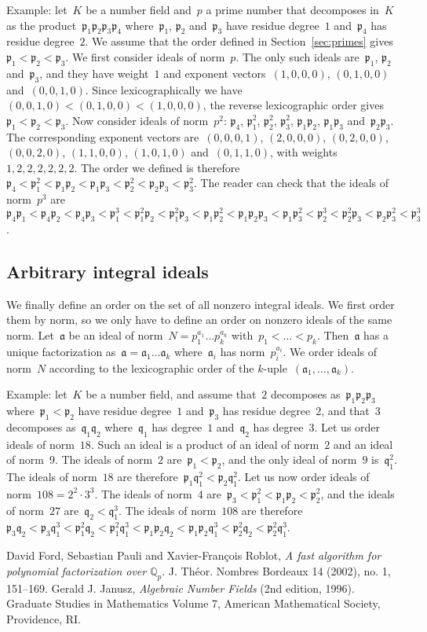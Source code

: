 \documentclass{article}
\def\a{{\mathfrak a}}
\def\p{{\mathfrak p}}
\def\q{{\mathfrak q}}
\begin{document}
Example: let~$K$ be a number field and~$p$ a prime number that decomposes in~$K$
as the product~$\p_1\p_2\p_3\p_4$ where~$\p_1$, $\p_2$ and~$\p_3$ have residue
degree~$1$ and~$\p_4$ has residue degree~$2$. We assume that the order defined
in Section~\ref{sec:primes} gives~$\p_1 < \p_2 < \p_3$. We first consider ideals
of norm~$p$. The only such ideals are~$\p_1$, $\p_2$ and~$\p_3$, and they have weight~$1$
and exponent vectors~$(1,0,0,0)$, $(0,1,0,0)$ and~$(0,0,1,0)$. Since
lexicographically we have~$(0,0,1,0)<(0,1,0,0)<(1,0,0,0)$, the reverse
lexicographic order gives~$\p_1<\p_2<\p_3$. Now
consider ideals of norm~$p^2$: $\p_4$, $\p_1^2$, $\p_2^2$, $\p_3^2$, $\p_1\p_2$,
$\p_1\p_3$ and~$\p_2\p_3$. The corresponding exponent vectors are~$(0,0,0,1)$,
$(2,0,0,0)$, $(0,2,0,0)$, $(0,0,2,0)$, $(1,1,0,0)$, $(1,0,1,0)$ and~$(0,1,1,0)$,
with weights~$1,2,2,2,2,2,2$. The order we defined is therefore~$\p_4 < \p_1^2 <
\p_1\p_2 < \p_1\p_3 < \p_2^2 < \p_2\p_3 < \p_3^2$. The reader can check that the
ideals of norm~$p^3$ are~$\p_4\p_1 < \p_4\p_2 < \p_4\p_3 < \p_1^3 < \p_1^2\p_2 <
\p_1^2\p_3 < \p_1\p_2^2 < \p_1\p_2\p_3 < \p_1\p_3^2 < \p_2^3 < \p_2^2\p_3 <
\p_2\p_3^2 < \p_3^3$.

\subsection{Arbitrary integral ideals}

We finally define an order on the set of all nonzero integral ideals. We first order
them by norm, so we only have to define an order on nonzero ideals of the same
norm. Let~$\a$ be an ideal of norm~$N = p_1^{a_1}\dots p_k^{a_k}$ with~$p_1 <
\dots < p_k$. Then~$\a$ has a unique factorization as~$\a = \a_1\dots\a_k$
where~$\a_i$ has norm~$p_i^{a_i}$. We order ideals of norm~$N$ according to the
lexicographic order of the $k$-uple~$(\a_1,\dots,\a_k)$.

Example: let~$K$ be a number field, and assume that~$2$ decomposes
as~$\p_1\p_2\p_3$ where~$\p_1<\p_2$ have residue degree~$1$ and~$\p_3$ has
residue degree~$2$, and that~$3$ decomposes as~$\q_1\q_2$ where~$\q_1$ has
degree~$1$ and~$\q_2$ has degree~$3$. Let us order ideals of norm~$18$. Such an
ideal is a product of an ideal of norm~$2$ and an ideal of norm~$9$. The ideals
of norm~$2$ are~$\p_1 < \p_2$, and the only ideal of norm~$9$ is~$\q_1^2$. The
ideals of norm~$18$ are therefore~$\p_1\q_1^2 < \p_2\q_1^2$. Let us now order ideals
of norm~$108 = 2^2\cdot 3^3$. The ideals of norm~$4$ are~$\p_3 < \p_1^2 < \p_1\p_2 <
\p_2^2$, and the ideals of norm~$27$ are~$\q_2 < \q_1^3$. The ideals of
norm~$108$ are therefore~$\p_3\q_2 < \p_3\q_1^3 < \p_1^2\q_2 < \p_1^2\q_1^3 <
\p_1\p_2\q_2 < \p_1\p_2\q_1^3 < \p_2^2\q_2 < \p_2^2\q_1^3$.


\begin{thebibliography}{10}
 David Ford, Sebastian Pauli and Xavier-Fran\c cois Roblot, {\em
  A fast algorithm for polynomial factorization over $\mathbb{Q}_p$}. J.
  Th\'eor. Nombres Bordeaux 14 (2002), no. 1, 151--169.
 Gerald J. Janusz, {\em Algebraic Number Fields} (2nd
  edition, 1996).  Graduate Studies in Mathematics Volume 7, American
  Mathematical Society, Providence, RI.
\end{thebibliography}
\end{document}
